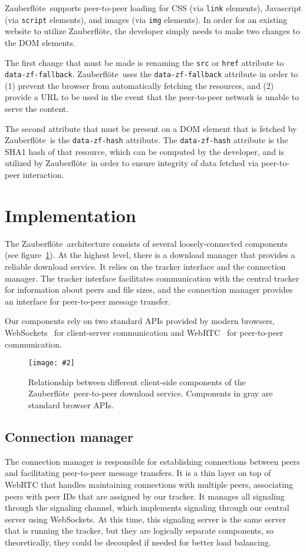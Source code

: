 \documentclass[letterpaper,twocolumn,10pt]{article}
\newcommand{\zbf}{Zauberfl\"{o}te}
\newcommand{\inclfigure}[3]{
    \begin{figure}
        \begin{centering}
            \texttt{[image: \#2]}
            \caption{#3}
            \label{#1}
        \end{centering}
    \end{figure}
}
\begin{document}
\zbf\ supports peer-to-peer loading for CSS (via \texttt{link} elements), Javascript (via \texttt{script} elements), and images (via \texttt{img} elements). In order for an existing website to utilize \zbf, the developer simply needs to make two changes to the DOM elements.

The first change that must be made is renaming the \texttt{src} or \texttt{href} attribute to  \texttt{data-zf-fallback}. \zbf\ uses the \texttt{data-zf-fallback} attribute in order to (1) prevent the browser from automatically fetching the resources, and (2) provide a URL to be used in the event that the peer-to-peer network is unable to serve the content.  

The second attribute that must be present on a DOM element that is fetched by \zbf\ is the \texttt{data-zf-hash} attribute. The \texttt{data-zf-hash} attribute is the SHA1 hash of that resource, which can be computed by the developer, and is utilized by \zbf\ in order to ensure integrity of data fetched via peer-to-peer interaction.

\section{Implementation}

The \zbf\ architecture consists of several loosely-connected components (see
figure~\ref{fig:components}). At the highest level, there is a download manager that
provides a reliable download service. It relies on the tracker interface and
the connection manager. The tracker interface facilitates communication with
the central tracker for information about peers and file sizes, and the
connection manager provides an interface for peer-to-peer message transfer.

Our components rely on two standard APIs provided by modern browsers,
WebSockets~\cite{w3c:websocket} for client-server communication and
WebRTC~\cite{w3c:webrtc} for peer-to-peer communication.

\inclfigure{fig:components}{components.pdf}{
    Relationship between different client-side components of the \zbf\
    peer-to-peer download service. Components in gray are standard browser
    APIs.
}

\subsection{Connection manager}

The connection manager is responsible for establishing connections between
peers and facilitating peer-to-peer message transfers. It is a thin layer on
top of WebRTC that handles maintaining connections with multiple peers,
associating peers with peer IDs that are assigned by our tracker. It manages
all signaling through the signaling channel, which implements signaling through
our central server using WebSockets. At this time, this signaling server is the
same server that is running the tracker, but they are logically separate
components, so theoretically, they could be decoupled if needed for better load
balancing.
\end{document}
